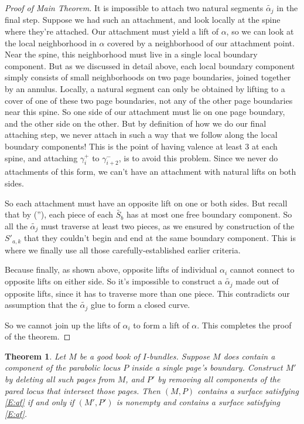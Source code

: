 \documentclass[12pt]{amsart}
\newtheorem{thm}[theorem]{Theorem}
\theoremstyle{definition}
\theoremstyle{remark}
\begin{document}
\begin{proof}[Proof of Main Theorem]
It is impossible to attach two natural segments $\widetilde{\alpha_j}$ in the final
step.  Suppose we had such an attachment, and look locally at the spine where
they're attached. Our attachment must yield a lift of $\alpha$, so we can look
at the local neighborhood in $\alpha$ covered by a neighborhood of our
attachment point.  Near the spine, this neighborhood must live in a single
local boundary component. But as we discussed in detail above, each local
boundary component simply consists of small neighborhoods on two page
boundaries, joined together by an annulus. Locally, a natural segment can only
be obtained by lifting to a cover of one of these two page boundaries, not any
of the other page boundaries near this spine. So one side of our attachment
must lie on one page boundary, and the other side on the other. But by
definition of how we do our final attaching step, we never attach in such a way
that we follow along the local boundary components! This is the point of having
valence at least 3 at each spine, and attaching $\gamma_i^+$ to
$\gamma_{i+2}^-$, is to avoid this problem. Since we never do attachments of
this form, we can't have an attachment with natural lifts on both sides.

So each attachment must have an opposite lift on one or both sides. But recall
that by (\dag''), each piece of each $\widetilde{S_b}$ has at most one free boundary
component. So all the $\widetilde{\alpha_j}$ must traverse at least two pieces, as we
ensured by construction of the $S'_{a,k}$ that they couldn't begin and end at the
same boundary component. This is where we finally use all those
carefully-established earlier criteria.

Because finally, as shown above, opposite lifts of individual $\alpha_i$ cannot
connect to opposite lifts on either side. So it's impossible to construct
a $\widetilde{\alpha_j}$ made out of opposite lifts, since it has to traverse
more than one piece.  This contradicts our assumption that the
$\widetilde{\alpha_j}$ glue to form a closed curve.

So we cannot join up the lifts of $\alpha_i$ to form a lift of $\alpha$. This
completes the proof of the theorem.

\end{proof}

\begin{thm}

Let $M$ be a good book of $I$-bundles.  Suppose $M$ does contain a component of
the parabolic locus $P$ inside a single page's boundary.  Construct $M'$ by
deleting all such pages from $M$, and $P'$ by removing all components of the
pared locus that intersect those pages. Then $(M,P)$ contains a surface
satisfying \eqref{E:qf} if and only if $(M',P')$ is nonempty and contains
a surface satisfying \eqref{E:qf}.

\end{thm}
\end{document}
